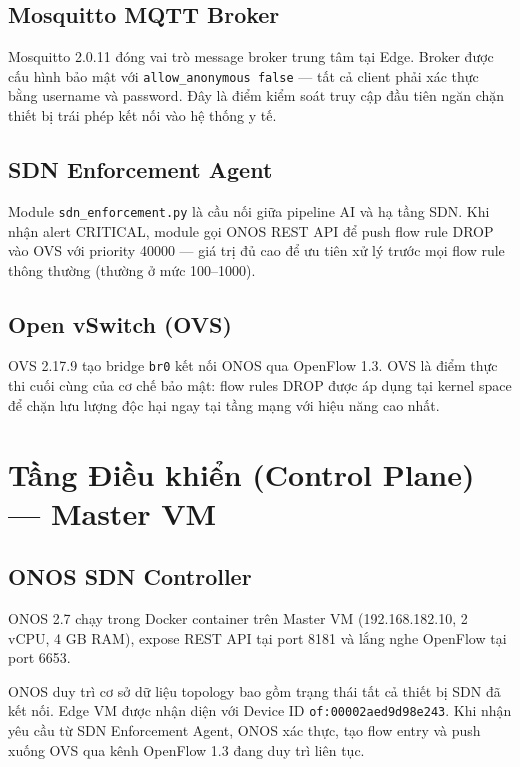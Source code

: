 \subsection{Mosquitto MQTT Broker}

Mosquitto 2.0.11 đóng vai trò message broker trung tâm tại Edge. Broker được cấu hình bảo mật với \texttt{allow\_anonymous false} — tất cả client phải xác thực bằng username và password. Đây là điểm kiểm soát truy cập đầu tiên ngăn chặn thiết bị trái phép kết nối vào hệ thống y tế.

\subsection{SDN Enforcement Agent}

Module \texttt{sdn\_enforcement.py} là cầu nối giữa pipeline AI và hạ tầng SDN. Khi nhận alert CRITICAL, module gọi ONOS REST API để push flow rule DROP vào OVS với priority 40000 — giá trị đủ cao để ưu tiên xử lý trước mọi flow rule thông thường (thường ở mức 100–1000).

\subsection{Open vSwitch (OVS)}

OVS 2.17.9 tạo bridge \texttt{br0} kết nối ONOS qua OpenFlow 1.3. OVS là điểm thực thi cuối cùng của cơ chế bảo mật: flow rules DROP được áp dụng tại kernel space để chặn lưu lượng độc hại ngay tại tầng mạng với hiệu năng cao nhất.

\section{Tầng Điều khiển (Control Plane) — Master VM}

\subsection{ONOS SDN Controller}

ONOS 2.7 chạy trong Docker container trên Master VM (192.168.182.10, 2 vCPU, 4 GB RAM), expose REST API tại port 8181 và lắng nghe OpenFlow tại port 6653.

ONOS duy trì cơ sở dữ liệu topology bao gồm trạng thái tất cả thiết bị SDN đã kết nối. Edge VM được nhận diện với Device ID \texttt{of:00002aed9d98e243}. Khi nhận yêu cầu từ SDN Enforcement Agent, ONOS xác thực, tạo flow entry và push xuống OVS qua kênh OpenFlow 1.3 đang duy trì liên tục.

